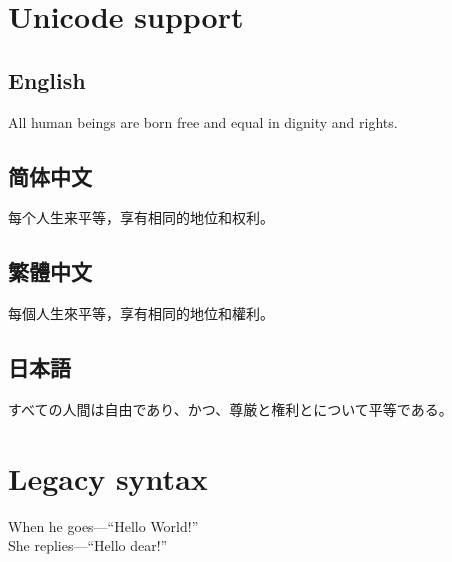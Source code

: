 \documentclass[a4paper]{article}
\begin{document}
\pagestyle{empty}
\section{Unicode support}
\subsection{English}
All human beings are born free and equal in dignity and rights.
\subsection{简体中文}
每个人生来平等，享有相同的地位和权利。
\subsection{繁體中文}
每個人生來平等，享有相同的地位和權利。
\subsection{日本語}
すべての人間は自由であり、かつ、尊厳と権利とについて平等である。
\section{Legacy syntax}
When he goes---``Hello World!''\\
She replies—“Hello dear!”
\end{document}
